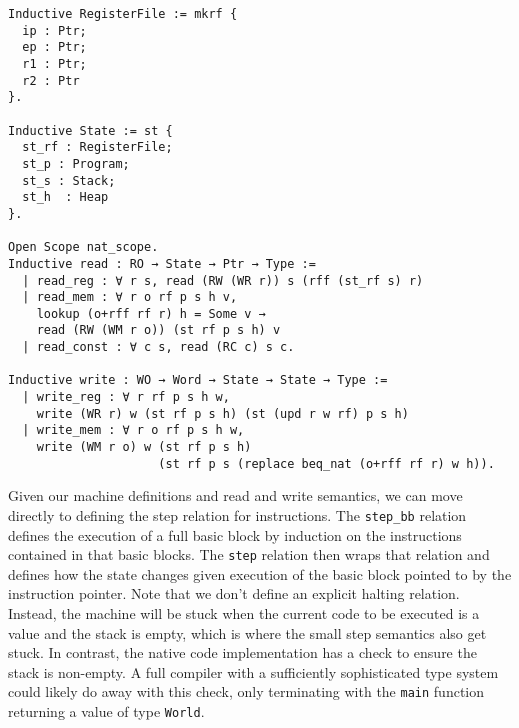 \begin{verbatim}
Inductive RegisterFile := mkrf {
  ip : Ptr;
  ep : Ptr;
  r1 : Ptr; 
  r2 : Ptr
}. 

Inductive State := st {
  st_rf : RegisterFile;
  st_p : Program;
  st_s : Stack;
  st_h  : Heap
}.

Open Scope nat_scope. 
Inductive read : RO → State → Ptr → Type :=
  | read_reg : ∀ r s, read (RW (WR r)) s (rff (st_rf s) r)
  | read_mem : ∀ r o rf p s h v, 
    lookup (o+rff rf r) h = Some v →
    read (RW (WM r o)) (st rf p s h) v
  | read_const : ∀ c s, read (RC c) s c.

Inductive write : WO → Word → State → State → Type :=
  | write_reg : ∀ r rf p s h w, 
    write (WR r) w (st rf p s h) (st (upd r w rf) p s h)
  | write_mem : ∀ r o rf p s h w, 
    write (WM r o) w (st rf p s h) 
                     (st rf p s (replace beq_nat (o+rff rf r) w h)).
\end{verbatim}

Given our machine definitions and read and write semantics, we can move directly
to defining the step relation for instructions. The \texttt{step\_bb} relation
defines the execution of a full basic block by induction on the instructions
contained in that basic blocks. The \texttt{step} relation then wraps that
relation and defines how the state changes given execution of the basic block
pointed to by the instruction pointer. Note that we don't define an explicit
halting relation. Instead, the machine will be stuck when the current code to be
executed is a value and the stack is empty, which is where the small step
\ce semantics also get stuck. In contrast, the native code implementation has a
check to ensure the stack is non-empty. A full compiler with a sufficiently
sophisticated type system could likely do away with this check, only terminating
with the \texttt{main} function returning a value of type \texttt{World}. 

